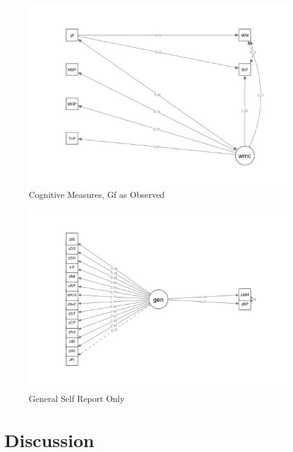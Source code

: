 \documentclass[]{book}
\begin{document}
\begin{figure}

{\centering \includegraphics[width=1\linewidth]{img/sem4} 

}

\caption{Cognitive Measures, Gf as Observed}\label{fig:model4}
\end{figure}

\begin{figure}

{\centering \includegraphics[width=1\linewidth]{img/sem5} 

}

\caption{General Self Report Only}\label{fig:model5}
\end{figure}

\hypertarget{discussion}{%
\section{Discussion}\label{discussion}}
\end{document}

